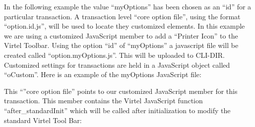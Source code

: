 \documentclass[letterpaper,10pt,english]{sphinxmanual}
\begin{document}
In the following example the value “myOptions” has been chosen as an “id” for a particular transaction. A transaction level “core option file”, using the format “option.id.js”, will be used to locate they customized elements. In this example we are using a customized JavaScript member to add a “Printer Icon” to the Virtel Toolbar. Using the option “id” of “myOptions” a javascript file will be created called “option.myOptions.js”. This will be uploaded to CLI-DIR. Customized settings for transactions are held in a JavaScript object called “oCustom”. Here is an example of the myOptions JavaScript file:

\begin{sphinxVerbatim}[commandchars=\\\{\}]
       
 
\end{sphinxVerbatim}


This “”core option file” points to our customized JavaScript member for this transaction. This member contains the Virtel JavaScript function “after\_standardInit” which will be called after initialization to modify the standard Virtel Tool Bar:

\begin{sphinxVerbatim}[commandchars=\\\{\}]
  
    
  
     

  
  
\end{sphinxVerbatim}
\end{document}
